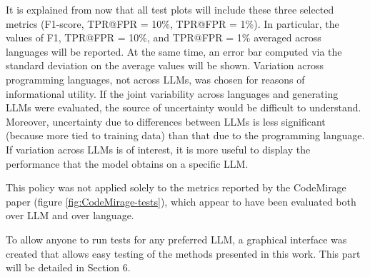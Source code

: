 It is explained from now that all test plots will include these three selected metrics 
(F1-score, TPR@FPR = 10\%, TPR@FPR = 1\%). In particular, the values of F1, TPR@FPR = 
10\%, and TPR@FPR = 1\% averaged across languages will be reported. 
At the same time, an error bar computed via the standard deviation on 
the average values will be shown. Variation across programming languages, 
not across LLMs, was chosen for reasons of informational utility. If the 
joint variability across languages and generating LLMs were evaluated, the 
source of uncertainty would be difficult to understand. Moreover, uncertainty 
due to differences between LLMs is less significant (because more tied to training 
data) than that due to the programming language. If variation across LLMs is of 
interest, it is more useful to display the performance that the model obtains on a 
specific LLM.

This policy was not applied solely to the metrics reported by the 
CodeMirage paper (figure \ref{fig:CodeMirage-tests}), which appear to have been evaluated both over LLM and over language.

To allow anyone to run tests for any preferred LLM, 
a graphical interface was created that allows easy testing 
of the methods presented in this work. This part will be detailed in Section 6.